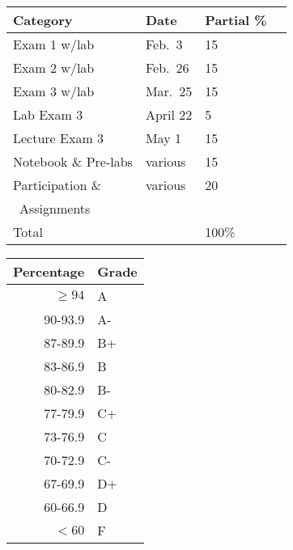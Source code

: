 \documentclass{tufte-handout}
\begin{document}
\begin{tabular}{l l l r}
Category &  Date & Partial \%  \\
\hline
 Exam 1 w/lab & Feb.\ 3 & 15 \\							%
 Exam 2 w/lab & Feb.\ 26 & 15 \\							%
 Exam 3 w/lab & Mar.\ 25 & 15 \\						%
 Lab Exam 3 & April 22 & 5 \\
 Lecture Exam 3 & May 1 & 15 \\ 
 Notebook \& Pre-labs & various & 15 \\							%
Participation \& &  various  & 20 \\
\, Assignments \\
\hline
Total & &   100\%
\end{tabular}


\begin{margintable}
\begin{tabular}{rl}
Percentage & Grade \\
\hline 
$\ge94$ & A \\
90-93.9 & A- \\
87-89.9 & B+ \\
83-86.9 & B \\
80-82.9 & B- \\
77-79.9 & C+ \\
73-76.9 & C \\
70-72.9 & C- \\
67-69.9 & D+ \\
60-66.9 & D \\
$<60$ & F \\
\hline
\end{tabular}
\end{margintable}
\end{document}
